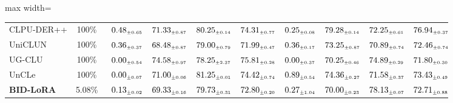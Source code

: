 \begin{table}[!htbp]
\begin{adjustbox}{max width=\textwidth}
\begin{tabular}{l|c|cccc|cccc}
CLPU-DER++ & 100\% & $\kern6pt0.48_{\scriptscriptstyle \pm 0.65}\kern-6pt$ & $\kern6pt71.33_{\scriptscriptstyle \pm 0.87}\kern-6pt$ & \colorbox{yellow!35}{$\kern6pt80.25_{\scriptscriptstyle \pm 0.14}\kern-6pt$} & $\kern6pt74.31_{\scriptscriptstyle \pm 0.77}\kern-6pt$ & $\kern6pt0.25_{\scriptscriptstyle \pm 0.08}\kern-6pt$ & \colorbox{green!25}{$\kern6pt79.28_{\scriptscriptstyle \pm 0.14}\kern-6pt$} & $\kern6pt72.25_{\scriptscriptstyle \pm 0.61}\kern-6pt$ & \colorbox{green!25}{$\kern6pt76.94_{\scriptscriptstyle \pm 0.37}\kern-6pt$} \\
UniCLUN & 100\% & $\kern6pt0.36_{\scriptscriptstyle \pm 0.37}\kern-6pt$ & $\kern6pt68.48_{\scriptscriptstyle \pm 0.87}\kern-6pt$ & $\kern6pt79.00_{\scriptscriptstyle \pm 0.79}\kern-6pt$ & $\kern6pt71.99_{\scriptscriptstyle \pm 0.47}\kern-6pt$ & $\kern6pt0.36_{\scriptscriptstyle \pm 0.17}\kern-6pt$ & $\kern6pt73.25_{\scriptscriptstyle \pm 0.87}\kern-6pt$ & $\kern6pt70.89_{\scriptscriptstyle \pm 0.74}\kern-6pt$ & $\kern6pt72.46_{\scriptscriptstyle \pm 0.74}\kern-6pt$ \\
UG-CLU & 100\% & $\kern6pt0.00_{\scriptscriptstyle \pm 0.54}\kern-6pt$ & \colorbox{green!25}{$\kern6pt74.58_{\scriptscriptstyle \pm 0.97}\kern-6pt$} & $\kern6pt78.25_{\scriptscriptstyle \pm 2.37}\kern-6pt$ & \colorbox{green!25}{$\kern6pt75.81_{\scriptscriptstyle \pm 0.28}\kern-6pt$} & $\kern6pt0.00_{\scriptscriptstyle \pm 0.37}\kern-6pt$ & $\kern6pt70.25_{\scriptscriptstyle \pm 0.46}\kern-6pt$ & \colorbox{yellow!35}{$\kern6pt74.89_{\scriptscriptstyle \pm 0.29}\kern-6pt$} & $\kern6pt71.80_{\scriptscriptstyle \pm 0.30}\kern-6pt$ \\
UnCLe & 100\% & $\kern6pt0.00_{\scriptscriptstyle \pm 0.07}\kern-6pt$ & $\kern6pt71.00_{\scriptscriptstyle \pm 0.06}\kern-6pt$ & \colorbox{green!25}{$\kern6pt81.25_{\scriptscriptstyle \pm 0.01}\kern-6pt$} & \colorbox{yellow!35}{$\kern6pt74.42_{\scriptscriptstyle \pm 0.74}\kern-6pt$} & $\kern6pt0.89_{\scriptscriptstyle \pm 0.54}\kern-6pt$ & $\kern6pt74.36_{\scriptscriptstyle \pm 0.27}\kern-6pt$ & $\kern6pt71.58_{\scriptscriptstyle \pm 0.37}\kern-6pt$ & $\kern6pt73.43_{\scriptscriptstyle \pm 0.49}\kern-6pt$ \\
\midrule
\rowcolor{pink!15}
\textbf{BID-LoRA} & 5.08\% & $\kern6pt0.13_{\scriptscriptstyle \pm 0.02}\kern-6pt$ & $\kern6pt69.33_{\scriptscriptstyle \pm 0.16}\kern-6pt$ & $\kern6pt79.73_{\scriptscriptstyle \pm 0.31}\kern-6pt$ & $\kern6pt72.80_{\scriptscriptstyle \pm 0.20}\kern-6pt$ & $\kern6pt0.27_{\scriptscriptstyle \pm 1.04}\kern-6pt$ & $\kern6pt70.00_{\scriptscriptstyle \pm 0.23}\kern-6pt$ & \colorbox{green!25}{$\kern6pt78.13_{\scriptscriptstyle \pm 0.07}\kern-6pt$} & $\kern6pt72.71_{\scriptscriptstyle \pm 0.88}\kern-6pt$ \\

\end{tabular}
\end{adjustbox}
\end{table}
